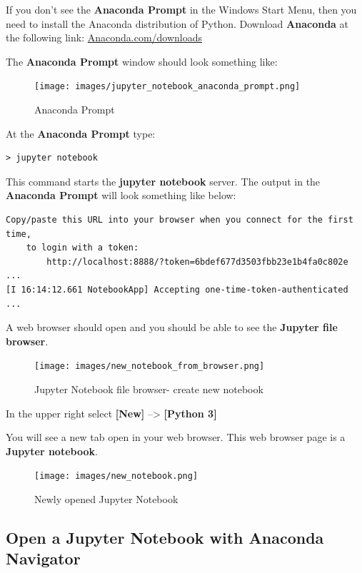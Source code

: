 \documentclass{book}
\begin{document}
If you don't see the \textbf{Anaconda Prompt} in the Windows Start Menu,
then you need to install the Anaconda distribution of Python. Download
\textbf{Anaconda} at the following link:
\href{https://www.anaconda.com/download/}{Anaconda.com/downloads}

The \textbf{Anaconda Prompt} window should look something like:

\begin{figure}
\centering
\texttt{[image: images/jupyter\_notebook\_anaconda\_prompt.png]}
\caption{Anaconda Prompt}
\end{figure}

At the \textbf{Anaconda Prompt} type:

\begin{lstlisting}
> jupyter notebook
\end{lstlisting}

This command starts the \textbf{jupyter notebook} server. The output in
the \textbf{Anaconda Prompt} will look something like below:

\begin{lstlisting}
Copy/paste this URL into your browser when you connect for the first time,
    to login with a token:
        http://localhost:8888/?token=6bdef677d3503fbb23e1b4fa0c802e ...
[I 16:14:12.661 NotebookApp] Accepting one-time-token-authenticated ...
\end{lstlisting}

A web browser should open and you should be able to see the
\textbf{Jupyter file browser}.

\begin{figure}
\centering
\texttt{[image: images/new\_notebook\_from\_browser.png]}
\caption{Jupyter Notebook file browser- create new notebook}
\end{figure}

In the upper right select \textbf{{[}New{]}} --\textgreater{}
\textbf{{[}Python 3{]}}

You will see a new tab open in your web browser. This web browser page
is a \textbf{Jupyter notebook}.

\begin{figure}
\centering
\texttt{[image: images/new\_notebook.png]}
\caption{Newly opened Jupyter Notebook}
\end{figure}
    




    
        \subsection{Open a Jupyter Notebook with Anaconda
Navigator}\label{open-a-jupyter-notebook-with-anaconda-navigator}
    
\end{document}
